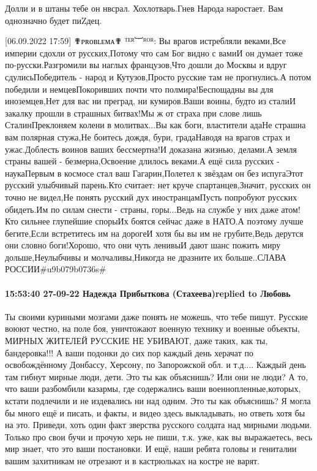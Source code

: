 Долли и в штаны тебе он нвсрал. Хохлотварь.Гнев Народа наростает. Вам
однозначно будет пиZдец.

[06.09.2022 17:59] ✟ᴘʀᴏʙʟᴇᴍᴀ✟ ᵀᴱᴿ︸ᴿᴼᴿ: Вы врагов истребляли веками,Все империи сдохли от русских,Потому что сам Бог видно с вамиИ он думает тоже по-русски.Разгромили вы наглых французов,Что дошли до Москвы и вдруг сдулисьПобедитель - народ и Кутузов,Просто русские там не прогнулись.А потом победили и немцевПокоривших почти что полмира!Беспощадны вы для иноземцев,Нет для вас ни преград, ни кумиров.Ваши воины, будто из сталиИ закалку прошли в страшных битвах!Мы ж от страха при слове лишь СталинПреклоняем колени в молитвах...Вы как боги, властители адаНе страшна вам полярная стужа,Не боитесь дождя, бури, градаНаводя на врагов страх и ужас.Доблесть воинов ваших бессмертна!И доказана жизнью, делами.А земля страны вашей - безмерна,Освоение длилось веками.А ещё сила русских - наукаПервым в космосе стал ваш Гагарин,Полетел к звёздам он без испугаЭтот русский улыбчивый парень.Кто считает: нет круче спартанцев,Значит, русских он точно не видел,Не понять русский дух иностранцамПусть попробуют русских обидеть.Им по силам снести - страны, горы...Ведь на службе у них даже атом!Кто сильнее глупейшие спорыИх боятся сейчас даже в НАТО.А поэтому лучше бегите,Если встретитесь им на дорогеИ хотя бы вы им не грубите,Ведь дерутся они словно боги!Хорошо, что они чуть ленивыИ дают шанс пожить миру дольше,Неулыбчивы и молчаливы,Никогда не дразните их больше..СЛАВА РОССИИ#u9b079b0736s#


\paragraph{15:53:40 27-09-22 Надежда Прибыткова (Стахеева)replied to Любовь}

Ты своими куриными мозгами даже понять не можешь, что тебе пишут. Русские воюют
честно, на поле боя, уничтожают военную технику и военные объекты, МИРНЫХ
ЖИТЕЛЕЙ РУССКИЕ НЕ УБИВАЮТ, даже таких, как ты, бандеровка!!! А ваши подонки до
сих пор каждый день херачат по освобождённому Донбассу, Херсону, по Запорожской
обл. и т.д.... Каждый день там гибнут мирные люди, дети. Это ты как объяснишь?
Или они не люди? А то, что ваши разбомбили казармы, где содержались ваши
военнопленные,которых, кстати подлечили и не издевались ни над одним. Это ты
как объяснишь? Я могла бы много ещё и писать, и факты, и видео здесь
выкладывать, но ответь хотя бы на это. Приведи, хоть один факт зверства
русского солдата над мирными людьми. Только про свои бучи и прочую херь не
пиши, т.к. уже, как вы выражаетесь, весь мир знает, что это ваши постановки. И
ещё, наши ребята головы и гениталии вашим захитникам не отрезают и в
кастрюльках на костре не варят.


